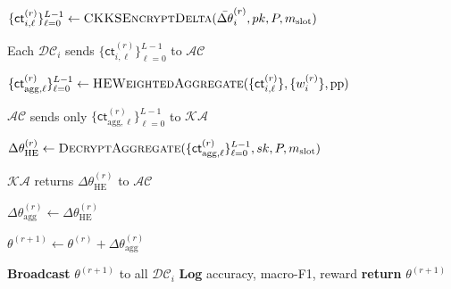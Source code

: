 \documentclass{article}
\begin{document}
\begin{algorithm}[H]
\begin{algorithmic}[1]
      \STATE $\{\mathsf{ct}_{i,\ell}^{(r)}\}_{\ell=0}^{L-1}
      \leftarrow \textsc{CKKSEncryptDelta} (\bar{\Delta\theta}_i^{(r)},pk,P,m_{\mathrm{slot}})$

    \ENDFOR

    \STATE Each $\mathcal{DC}_i$ sends
    $\{\mathsf{ct}_{i,\ell}^{(r)}\}_{\ell=0}^{L-1}$ to $\mathcal{AC}$

    \STATE $\{\mathsf{ct}_{\mathrm{agg},\ell}^{(r)}\}_{\ell=0}^{L-1}
    \leftarrow \textsc{HEWeightedAggregate}
    (\{\mathsf{ct}_{i,\ell}^{(r)}\},\{w_i^{(r)}\},\mathrm{pp})$

    \STATE $\mathcal{AC}$ sends only
    $\{\mathsf{ct}_{\mathrm{agg},\ell}^{(r)}\}_{\ell=0}^{L-1}$
    to $\mathcal{KA}$

    \STATE $\Delta\theta_{\mathrm{HE}}^{(r)}
    \leftarrow \textsc{DecryptAggregate}
    (\{\mathsf{ct}_{\mathrm{agg},\ell}^{(r)}\}_{\ell=0}^{L-1},
    sk,P,m_{\mathrm{slot}})$

    \STATE $\mathcal{KA}$ returns
    $\Delta\theta_{\mathrm{HE}}^{(r)}$ to $\mathcal{AC}$

    \STATE $\Delta\theta_{\mathrm{agg}}^{(r)}
    \leftarrow \Delta\theta_{\mathrm{HE}}^{(r)}$

    \STATE $\theta^{(r+1)}
    \leftarrow \theta^{(r)}+\Delta\theta_{\mathrm{agg}}^{(r)}$

    \STATE \textbf{Broadcast} $\theta^{(r+1)}$ to all $\mathcal{DC}_i$
    \STATE \textbf{Log} accuracy, macro-F1, reward
    \STATE \textbf{return} $\theta^{(r+1)}$
    \end{algorithmic}
\end{algorithm}
\end{document}
